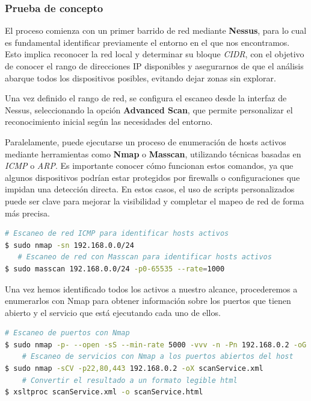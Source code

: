 \documentclass[a4paper, 11pt]{article}
\begin{document}
\subsubsection*{Prueba de concepto}
El proceso comienza con un primer barrido de red mediante \textbf{Nessus}, para lo cual es fundamental identificar previamente el entorno en el que nos encontramos. Esto implica reconocer la red local y determinar su bloque \textit{CIDR}, con el objetivo de conocer el rango de direcciones IP disponibles y asegurarnos de que el análisis abarque todos los dispositivos posibles, evitando dejar zonas sin explorar.


Una vez definido el rango de red, se configura el escaneo desde la interfaz de Nessus, seleccionando la opción \textbf{Advanced Scan}, que permite personalizar el reconocimiento inicial según las necesidades del entorno.


Paralelamente, puede ejecutarse un proceso de enumeración de hosts activos mediante herramientas como \textbf{Nmap} o \textbf{Masscan}, utilizando técnicas basadas en \textit{ICMP} o \textit{ARP}. Es importante conocer cómo funcionan estos comandos, ya que algunos dispositivos podrían estar protegidos por firewalls o configuraciones que impidan una detección directa. En estos casos, el uso de scripts personalizados puede ser clave para mejorar la visibilidad y completar el mapeo de red de forma más precisa.



\begin{lstlisting}[language=bash, style=terminalstyle, caption=Escaneo de activos en la red]
    # Escaneo de red ICMP para identificar hosts activos
$ sudo nmap -sn 192.168.0.0/24
   # Escaneo de red con Masscan para identificar hosts activos 
$ sudo masscan 192.168.0.0/24 -p0-65535 --rate=1000
\end{lstlisting}


Una vez hemos identificado todos los activos a nuestro alcance, procederemos a enumerarlos con Nmap para obtener información sobre los puertos que tienen abierto y el servicio que está ejecutando cada uno de ellos.

\begin{lstlisting}[language=bash, style=terminalstyle, caption=Escaneo de puertos y servicios con Nmap]
    # Escaneo de puertos con Nmap
$ sudo nmap -p- --open -sS --min-rate 5000 -vvv -n -Pn 192.168.0.2 -oG allPorts
    # Escaneo de servicios con Nmap a los puertos abiertos del host
$ sudo nmap -sCV -p22,80,443 192.168.0.2 -oX scanService.xml
    # Convertir el resultado a un formato legible html
$ xsltproc scanService.xml -o scanService.html
\end{lstlisting}
\end{document}
